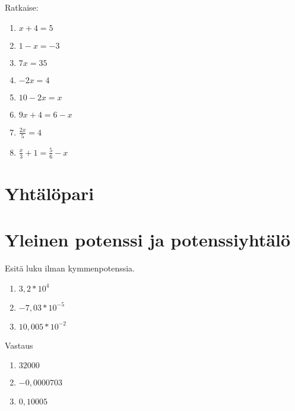 \begin{tehtava}
%
Ratkaise:
\begin{enumerate}
\item $x + 4 = 5$
\item $1 - x = -3$
\item $7x = 35$
\item $-2x = 4$
\item $10 - 2x = x$
\item $9x + 4 = 6 - x$
\item $\frac{2x}{5} = 4$
\item $\frac{x}{3} + 1 = \frac{5}{6} - x$

\end{enumerate}

\end{tehtava}

\chapter{Yhtälöpari}


\chapter{Yleinen potenssi ja potenssiyhtälö}

\begin{tehtava}
Esitä luku ilman kymmenpotenssia.
\begin{enumerate}
\item $3,2 * 10^4$
\item $-7,03 * 10^{-5}$
\item $10,005 * 10^{-2}$
\end{enumerate}
\begin{vastaus}
Vastaus
\begin{enumerate}
\item $32000$
\item $-0,0000703$
\item $0,10005$
\end{enumerate}
\end{vastaus}
\end{tehtava}

